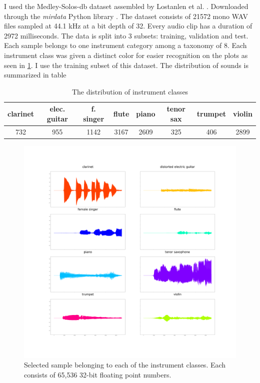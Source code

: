 \documentclass[a4paper, 12pt, twoside]{report}
\begin{document}
I used the Medley-Solos-db dataset assembled by Lostanlen et al. \cite{medley}. Downloaded through the \textit{ mirdata } Python library \cite{bittner_fuentes_2019}. The dataset consists of 21572 mono WAV files sampled at 44.1 kHz at a bit depth of 32. Every audio clip has a duration of 2972 milliseconds. The data is split into 3 subsets: training, validation and test. Each sample belongs to one instrument category among a taxonomy of 8. Each instrument class was given a distinct color for easier recognition on the plots as seen in \ref{fig:8-plots}. I use the training subset of this dataset. The distribution of sounds is summarized in table \

\begin{table}[h!b]
\centering
\begin{tabular}{ |c|c|c|c|c|c|c|c| }
\hline
clarinet & elec. guitar & f. singer & flute & piano & tenor sax & trumpet & violin \\
\hline
732 & 955 & 1142 & 3167 & 2609 & 325 & 406 & 2899 \\
\hline
\end{tabular}
\caption{\label{table:distr_of_sounds}The distribution of instrument classes}
\end{table}

\begin{figure}[h!]
\centering
\includegraphics[width=.9\linewidth]{./Figures/8_samples.png}
\caption{Selected sample belonging to each of the instrument classes. Each consists of 65,536 32-bit floating point numbers.}
\label{fig:8-plots}
\end{figure}
\end{document}
